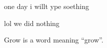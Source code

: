 one day i willt ype soething

lol we did nothing

\begin{definition}[Grow]\label{dfn:1}
	Grow is a word meaning ``grow''.
\end{definition}
